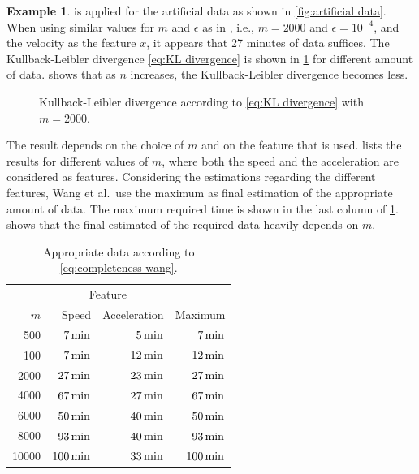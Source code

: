 \documentclass[10pt,final,a4paper,oneside,onecolumn]{article}
\newlength\figurewidth
\newlength\figureheight
\newcommand*{\etal}{et al.}                                     %
\theoremstyle{plain}\newtheorem{definition}{Definition}[section]    %
\theoremstyle{definition}\newtheorem{example}{Example}[section]     %
\theoremstyle{remark}\newtheorem{remarkenv}{Remark}[section]        %
\newcommand{\otoprule}{\midrule[\heavyrulewidth]}
\begin{document}
\begin{example}
	 is applied for the artificial data as shown in \cref{fig:artificial data}. When using similar values for $m$ and $\epsilon$ as in \cite{wang2017much}, i.e., $m=2000$ and $\epsilon=10^{-4}$, and the velocity as the feature $x$, it appears that 27 minutes of data suffices. The Kullback-Leibler divergence \cref{eq:KL divergence} is shown in \cref{fig:kl sample based} for different amount of data.  shows that as $n$ increases, the Kullback-Leibler divergence becomes less. 
	
	\setlength{}
	\setlength\figureheight{0.7\figurewidth}
	\begin{figure}
		\centering
		\caption{Kullback-Leibler divergence according to \cref{eq:KL divergence} with $m=2000$.}
		\label{fig:kl sample based}
	\end{figure}
	
	The result depends on the choice of $m$ and on the feature that is used.  lists the results for different values of $m$, where both the speed and the acceleration are considered as features. Considering the estimations regarding the different features, Wang \etal\ use the maximum as final estimation of the appropriate amount of data. The maximum required time is shown in the last column of \cref{tab:wang result}.  shows that the final estimated of the required data heavily depends on $m$.
		
	\begin{table}
		\centering
		\caption{Appropriate data according to \cref{eq:completeness wang}.}
		\label{tab:wang result}
		\begin{tabular}{rrrr}
			\toprule
			& \multicolumn{2}{c}{Feature} & \\
			$m$ & Speed & Acceleration & Maximum \\ \otoprule
			500 & $\unit[7]{min}$ & $\unit[5]{min}$ & $\unit[7]{min}$ \\
			100 & $\unit[7]{min}$ & $\unit[12]{min}$ & $\unit[12]{min}$ \\
			2000 & $\unit[27]{min}$ & $\unit[23]{min}$ & $\unit[27]{min}$ \\
			4000 & $\unit[67]{min}$ & $\unit[27]{min}$ & $\unit[67]{min}$ \\
			6000 & $\unit[50]{min}$ & $\unit[40]{min}$ & $\unit[50]{min}$ \\
			8000 & $\unit[93]{min}$ & $\unit[40]{min}$ & $\unit[93]{min}$ \\
			10000 & $\unit[100]{min}$ & $\unit[33]{min}$ & $\unit[100]{min}$ \\
			\bottomrule
		\end{tabular}
	\end{table}
\end{example}
\end{document}
